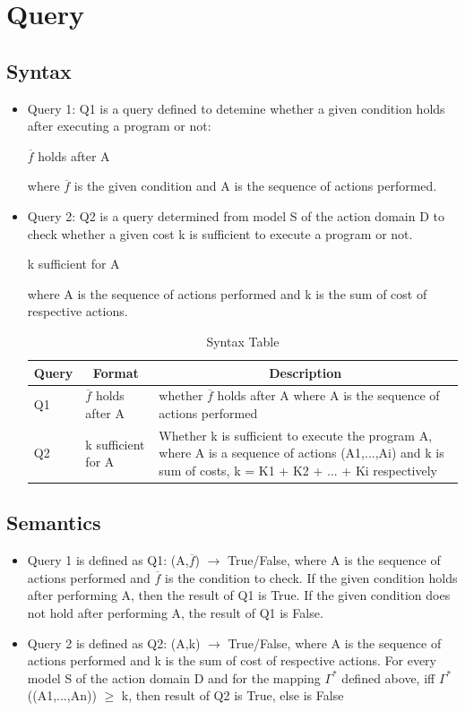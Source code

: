 \documentclass[11pt]{article}
\begin{document}
\section{Query}
\subsection{Syntax}
\begin{itemize}
\item{Query 1: Q1 is a query defined to detemine whether a given condition holds after executing a program or not:
\begin{center}
	$\overline{f}$ holds after A
\end{center}
where $\overline{f}$ is the given condition and A is the sequence of actions performed.
}
\item{Query 2: Q2 is a query determined from model S of the action domain D to check whether a given cost k is sufficient to execute a program or not.
\begin{center}
	k sufficient for A
\end{center}
where A is the sequence of actions performed and k is the sum of cost of respective actions.\\
}

\begin{table}[H]
	\centering
	\begin{tabular}{|p{2cm}|p{4cm}|p{7cm}|}
		\hline
		\multicolumn{1}{|c|}{\textbf{Query}} & \multicolumn{1}{c|}{\textbf{Format}} & \multicolumn{1}{c|}{\textbf{Description}} \\
		\hline
		Q1 & $\overline{f}$ holds after A & whether $\overline{f}$ holds after A where A is the sequence of actions performed\\
		\hline
		Q2 & k sufficient for A & Whether k is sufficient to execute the program A, where A is a sequence of actions (A1,...,Ai) and k is sum of costs, k = K1 + K2 + ... + Ki respectively\\
		\hline
	\end{tabular}
	\caption{Syntax Table}
	\label{tab:table01}
\end{table}
\end{itemize}
\subsection{Semantics}
\begin{itemize}
	\item{Query 1 is defined as Q1: (A,$\overline{f}$) $\rightarrow$ True/False, where A is the sequence of actions performed and $\overline{f}$} is the condition to check. If the given condition holds after performing A, then the result of Q1 is True. If the given condition does not hold after performing A, the result of Q1 is False.
	\item{Query 2 is defined as Q2: (A,k) $\rightarrow$ True/False, where A is the sequence of actions performed and k is the sum of cost of respective actions. For every model S of the action domain D and for the mapping $\Gamma^{\ast}$ defined above, iff $\Gamma^{\ast}$((A1,...,An)) $\ge$ k, then result of Q2 is True, else is False}
\end{itemize}
\end{document}
